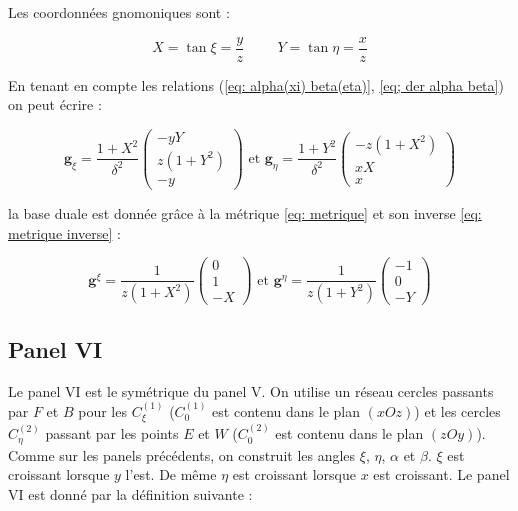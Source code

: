 Les coordonnées gnomoniques sont :

\begin{equation}
X = \tan \xi = \dfrac{y}{z} \hspace{1cm} Y = \tan \eta = \dfrac{x}{z}
\end{equation}

En tenant en compte les relations (\ref{eq: alpha(xi) beta(eta)}, \ref{eq; der alpha beta}) on peut écrire : 

\begin{equation}
\mathbf{g}_{\xi} = \dfrac{1+X^2}{\delta^2} \begin{pmatrix}
-yY \\ z(1+Y^2) \\ -y
\end{pmatrix} \text{ et } \mathbf{g}_{\eta} = \dfrac{1+Y^2}{\delta^2} \begin{pmatrix}
-z(1+X^2) \\ xX \\ x
\end{pmatrix}
\label{eq: base locale V}
\end{equation}

la base duale est donnée grâce à la métrique \eqref{eq: metrique} et son inverse \eqref{eq: metrique inverse} :

\begin{equation}
\mathbf{g}^{\xi} = \dfrac{1}{z(1+X^2)}\begin{pmatrix}
0 \\ 1 \\ -X
\end{pmatrix} \text{ et } \mathbf{g}^{\eta} = \dfrac{1}{z(1+Y^2)}\begin{pmatrix}
-1 \\ 0 \\ -Y
\end{pmatrix}
\label{eq: base duale V}
\end{equation}













\subsection{Panel VI}

Le panel VI est le symétrique du panel V. On utilise un réseau cercles passants par $F$ et $B$ pour les $C_{\xi}^{(1)}$ ($C_{0}^{(1)}$ est contenu dans le plan $(xOz)$) et les cercles $C_{\eta}^{(2)}$ passant par les points $E$ et $W$ ($C_{0}^{(2)}$ est contenu dans le plan $(zOy)$). Comme sur les panels précédents, on construit les angles $\xi$, $\eta$, $\alpha$ et $\beta$. $\xi$ est croissant lorsque $y$ l'est. De même $\eta$ est croissant lorsque $x$ est croissant.
Le panel VI est donné par la définition suivante :


